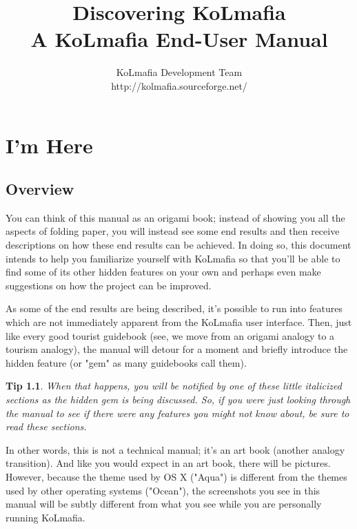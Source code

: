 \documentclass[twocolumn,letterpaper]{report}
\newtheorem{tip}{Tip}[section]
\begin{document}
\title{Discovering KoLmafia\\A KoLmafia End-User Manual}
\author{KoLmafia Development Team\\http://kolmafia.sourceforge.net/}
\maketitle

\tableofcontents

\chapter{I'm Here}

\section{Overview}

You can think of this manual as an origami book; instead of showing you all the aspects of folding paper, you will instead see some end results and then receive descriptions on how these end results can be achieved.  In doing so, this document intends to help you familiarize yourself with KoLmafia so that you'll be able to find some of its other hidden features on your own and perhaps even make suggestions on how the project can be improved.

As some of the end results are being described, it's possible to run into features which are not immediately apparent from the KoLmafia user interface.  Then, just like every good tourist guidebook (see, we move from an origami analogy to a tourism analogy), the manual will detour for a moment and briefly introduce the hidden feature (or "gem" as many guidebooks call them).

\begin{tip}
When that happens, you will be notified by one of these little italicized sections as the hidden gem is being discussed.  So, if you were just looking through the manual to see if there were any features you might not know about, be sure to read these sections.
\end{tip}

In other words, this is not a technical manual; it's an art book (another analogy transition).  And like you would expect in an art book, there will be pictures.  However, because the theme used by OS X ("Aqua") is different from the themes used by other operating systems ("Ocean"), the screenshots you see in this manual will be subtly different from what you see while you are personally running KoLmafia.
\end{document}
